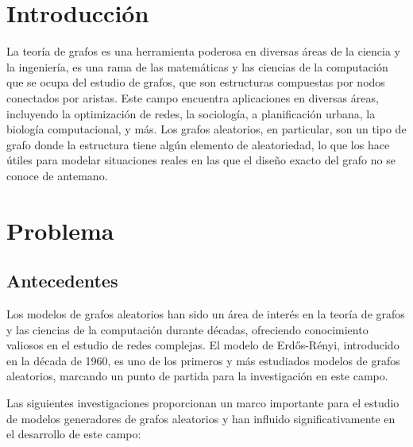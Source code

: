 \documentclass[12pt]{book}
\begin{document}
\renewcommand{\labelenumii}{\arabic{enumi}.\arabic{enumii}}
\renewcommand{\labelenumiii}{\arabic{enumi}.\arabic{enumii}.\arabic{enumiii}}
\renewcommand{\labelenumiv}{\arabic{enumi}.\arabic{enumii}.\arabic{enumiii}.\arabic{enumiv}}


\section{Introducción}
La teoría de grafos es una herramienta poderosa en diversas áreas de la ciencia y la ingeniería, es una rama de las matemáticas y las ciencias de la computación que se ocupa del estudio de grafos, que son estructuras compuestas por nodos 
conectados por aristas. Este campo encuentra aplicaciones en diversas áreas, incluyendo la optimización de redes, la sociología, 
a planificación urbana, la biología computacional, y más. Los grafos aleatorios, en particular, son un tipo de grafo donde la estructura tiene algún elemento de aleatoriedad, lo que los hace útiles para modelar situaciones reales en las que el diseño exacto del grafo no se conoce de antemano.

\section{Problema}
\subsection{Antecedentes}
Los modelos de grafos aleatorios han sido un área de interés en la teoría de grafos y las ciencias de la 
computación durante décadas, ofreciendo conocimiento valiosos en el estudio de redes complejas. El modelo
 de Erdős-Rényi, introducido en la década de 1960, es uno de los primeros y más estudiados modelos de grafos aleatorios, marcando un punto de partida para la investigación en este campo.

Las siguientes investigaciones proporcionan un marco importante para el estudio de modelos generadores de grafos aleatorios y han influido significativamente en el desarrollo de este campo:
\end{document}
